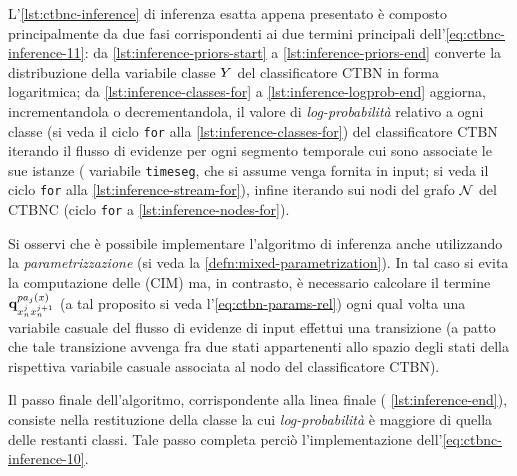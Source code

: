 L'\autoref{lst:ctbnc-inference} di inferenza esatta appena presentato è composto principalmente da due fasi corrispondenti ai due termini principali dell'\autoref{eq:ctbnc-inference-11}: da \autoref{lst:inference-priors-start} a \autoref{lst:inference-priors-end} converte la distribuzione della variabile classe $\mathnormal{Y}$ del classificatore \acs{CTBN} in forma logaritmica; da \autoref{lst:inference-classes-for} a \autoref{lst:inference-logprob-end} aggiorna, incrementandola o decrementandola, il valore di \emph{log-probabilità} relativo a ogni classe (si veda il ciclo \lstinline[]|for| alla \autoref{lst:inference-classes-for}) del classificatore \acs{CTBN} iterando il flusso di evidenze per ogni segmento temporale cui sono associate le sue istanze (\ie{} variabile \lstinline[]|timeseg|, che si assume venga fornita in input; si veda il ciclo \lstinline[]|for| alla \autoref{lst:inference-stream-for}), infine iterando sui nodi del grafo $\mathcal{N}$ del \acs{CTBNC} (ciclo \lstinline[]|for| a \autoref{lst:inference-nodes-for}).
\begin{nota}
Si osservi che è possibile implementare l'algoritmo di inferenza anche utilizzando la \emph{parametrizzazione } (si veda la \autoref{defn:mixed-parametrization}). In tal caso si evita la computazione delle \cim{} (\acs{CIM}) ma, in contrasto, è necessario calcolare il termine $\boldsymbol{\textbf{\text{q}}}_{\mathnormal{x}_n^j\mathnormal{x}_n^{j+1}}^{pa_j(\mathnormal{x})}$ (a tal proposito si veda l'\autoref{eq:ctbn-params-rel}) ogni qual volta una variabile casuale del flusso di evidenze di input effettui una transizione (a patto che tale transizione avvenga fra due stati appartenenti allo spazio degli stati della rispettiva variabile casuale associata al nodo del classificatore \acs{CTBN}).
\end{nota}

Il passo finale dell'algoritmo, corrispondente alla linea finale (\ie{} \autoref{lst:inference-end}), consiste nella restituzione della classe la cui \emph{log-probabilità} è maggiore di quella delle restanti classi. Tale passo completa perciò l'implementazione dell'\autoref{eq:ctbnc-inference-10}.


